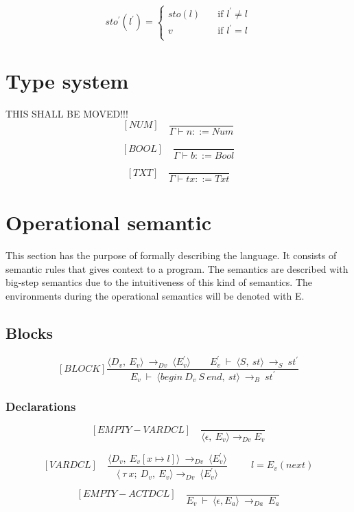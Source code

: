   \[ sto^{'}(l^{'}) =
    \begin{cases}
      sto(l)       & \quad \text{if } l^{'} \not= l\\
      v  & \quad \text{if } l^{'} = l\\
    \end{cases}
  \]
  
  
  
  
  \section{Type system}
  THIS SHALL BE MOVED!!!
	\[
	[NUM] \quad
	\dfrac{}{\Gamma \vdash n ::= Num}
	\]
	 
	\[
	[BOOL] \quad
	\dfrac{}{\Gamma \vdash b ::= Bool}
	\]
	
  	\[
  	[TXT] \quad
  	\dfrac{}{\Gamma \vdash tx ::= Txt}
  	\]
  	
  \section{Operational semantic}
  This section has the purpose of formally describing the language. It consists of semantic rules that gives context to a program. 
  The semantics are described with big-step semantics due to the intuitiveness of this kind of semantics. 
  The environments during the operational semantics will be denoted with E.
  
  \subsection{Blocks}
    \[
	  [BLOCK]
	  \dfrac{\langle D_v, \ E_v \rangle \ \rightarrow_{Dv} \ \langle E_v^{'} \rangle \qquad E_v^{'} \ \vdash \ \langle S, \ st \rangle \ \rightarrow_S \ st^{'}}{E_v \ \vdash \ \langle begin \ D_v \ S \ end, \ st \rangle \ \rightarrow_B \ st^{'}}
	  \]
  
  \subsubsection{Declarations}
  	\[
	[EMPTY-VARDCL] \quad
	\dfrac{}{\langle\epsilon, \ E_v\rangle \rightarrow_{Dv} E_v}
	\]
    	
   	\[
   	[VARDCL] \quad
   	\dfrac{ \langle D_v, \ E_v[x \mapsto l]\rangle \ \rightarrow_{Dv} \ \langle E_v^{'} \rangle }{ \langle \ \tau \ x; \ D_v,\ E_v \rangle \rightarrow_{Dv} \ \langle E_v^{'} \rangle }
   	\qquad \ \ l = E_v(next)
   	\]
    	
   	\[
   	[EMPTY-ACTDCL] \quad
   	\dfrac{}{E_v \ \vdash \ \langle \epsilon, E_a \rangle \ \rightarrow_{Da} \ E_a}
   	\]
    	
